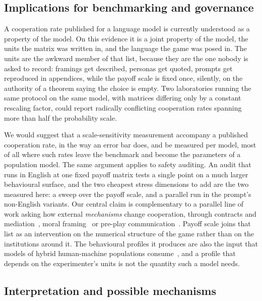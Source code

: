 \documentclass[openacc]{rsproca_new}
\begin{document}
\subsection{Implications for benchmarking and governance}\label{sec:disc_benchmarking}

A cooperation rate published for a language model is currently understood as a
property of the model. On this evidence it is a joint property of the model,
the units the matrix was written in, and the language the game was posed in.
The units are the awkward member of that list, because they are the one nobody
is asked to record: framings get described, personas get quoted, prompts get
reproduced in appendices, while the payoff scale is fixed once, silently, on
the authority of a theorem saying the choice is empty. Two laboratories running
the same protocol on the same model, with matrices differing only by a constant
rescaling factor, could report radically conflicting cooperation rates spanning
more than half the probability scale.

We would suggest that a scale-sensitivity measurement accompany a published
cooperation rate, in the way an error bar does, and be measured per model, most
of all where such rates leave the benchmark and become the parameters of a
population model. The same argument applies to safety auditing. An audit that
runs in English at one fixed payoff matrix tests a single point on a much
larger behavioural surface, and the two cheapest stress dimensions to add are
the two measured here: a sweep over the payoff scale, and a parallel run in the
prompt's non-English variants. Our central claim is complementary to a
parallel line of work asking how external \emph{mechanisms} change cooperation,
through contracts and mediation~\cite{tewolde2026coopeval}, moral
framing~\cite{backmann2025moralsim} or pre-play
communication~\cite{loreheydari2026communication}. Payoff scale joins that list
as an intervention on the numerical structure of the game rather than on the
institutions around it. The behavioural profiles it
produces are also the input that models of hybrid human-machine populations
consume~\cite{han2026social}, and a profile that depends on the experimenter's
units is not the quantity such a model needs.

\subsection{Interpretation and possible mechanisms}\label{sec:disc_mechanisms}
\end{document}
